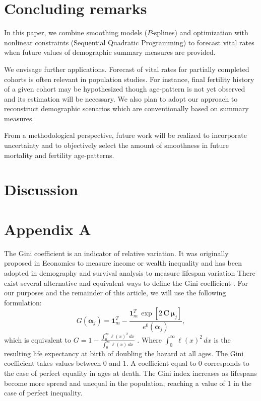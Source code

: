 \documentclass[a4paper,twoside, openright, 12pt, leqno]{article}
\begin{document}
\section{Concluding remarks}

In this paper, we combine smoothing models ($P$-splines) and optimization with nonlinear constraints (Sequential Quadratic Programming) to forecast vital rates when future values of demographic summary measures are provided. 

We envisage further applications. Forecast of vital rates for partially completed cohorts is often relevant in population studies. For instance, final fertility history of a given cohort may be hypothesized though age-pattern is not yet observed and its estimation will be necessary. We also plan to adopt our approach to reconstruct demographic scenarios which are conventionally based on summary measures. 

From a methodological perspective, future work will be realized to incorporate uncertainty and to objectively select the amount of smoothness in future mortality and fertility age-patterns.

\section{Discussion}



\section*{Appendix A}

The Gini coefficient is an indicator of relative variation. It was originally proposed in Economics to measure income or wealth inequality and  has been adopted in demography and survival analysis to measure lifespan variation \citep{Hanada1983,Shkolnikov2003,bonetti2009gini,gigliarano2017longevity} There exist several alternative and equivalent ways to define the Gini coefficient \citep{yitzhaki2013gini}. For our purposes and the remainder of this article, we will use the following formulation: 
%
\begin{equation}\label{eq:G}
G(\bm{\alpha}_{j}) = \bm{1}_{m}^{T} - \frac{ \bm{1}_{m}^{T} \, \exp[ 2\, \bm{C} \, \bm{\mu}_{j}] }{e^{0} (\bm{\alpha}_{j})}, 
\end{equation}
%
which is equivalent to $G = 1-\frac{\int_0^\infty\ell(x)^2\,dx}{\int_0^\infty\ell(x)\,dx}$ \citep{michettid1957,Hanada1983}.
Where $\int_0^\infty \ell(x)^2\,dx$ is the resulting life expectancy at birth of doubling the hazard at all ages. The Gini coefficient takes values between 0 and 1. A coefficient equal to 0 corresponds to the case of perfect equality in ages at death. The Gini index increases as lifespans become more spread and unequal in the population, reaching a value of 1 in the case of perfect inequality.



\linespread{1}\normalsize

\small



\end{document}
